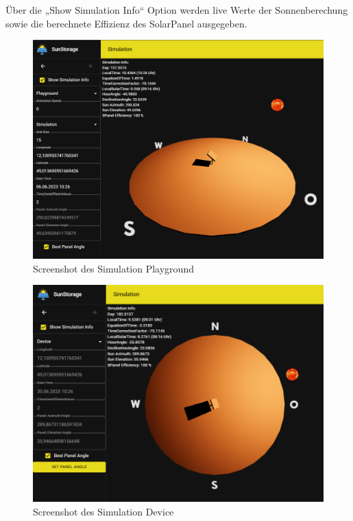  Über die „Show Simulation Info“ Option werden live Werte der Sonnenberechung sowie die berechnete Effizienz des SolarPanel ausgegeben.

 \begin{figure}[htpb] %
    \centering
    \includegraphics[width=\textwidth,keepaspectratio=true]{pics/Screenshot_WebUI_Simulation.png}
    \caption{Screenshot des Simulation Playground}
    \label{fig:SimulationScreenshotPlayground}
\end{figure}

\begin{figure}[htpb] %
    \centering
    \includegraphics[width=\textwidth,keepaspectratio=true]{pics/Screenshot_WebUI_Simulation_Device.png}
    \caption{Screenshot des Simulation Device}
    \label{fig:SimulationScreenshotDevice}
\end{figure}

